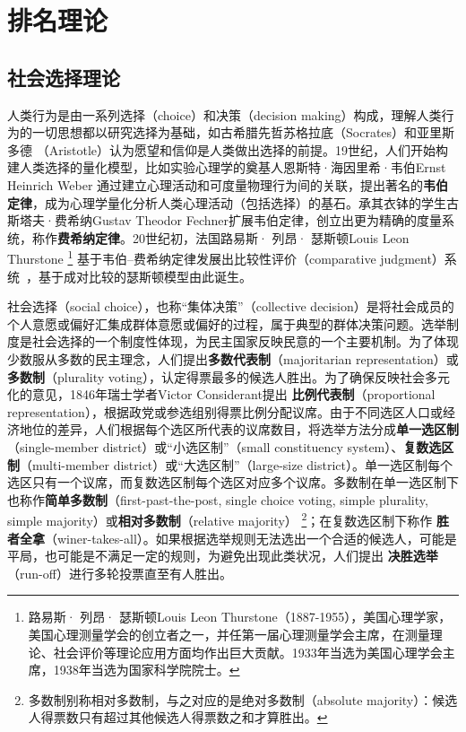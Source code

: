 \part{排名理论}

\chapter{社会选择理论}
人类行为是由一系列选择（choice）和决策（decision making）构成，理解人类行为的一切思想都以研究选择为基础，如古希腊先哲苏格拉底（Socrates）和亚里斯多德
（Aristotle）认为愿望和信仰是人类做出选择的前提。19世纪，人们开始构建人类选择的量化模型，比如实验心理学的奠基人恩斯特·海因里希·韦伯Ernst Heinrich Weber 通过建立心理活动和可度量物理行为间的关联，提出著名的\textbf{韦伯定律}，成为心理学量化分析人类心理活动（包括选择）的基石。承其衣钵的学生古斯塔夫·费希纳Gustav Theodor Fechner扩展韦伯定律，创立出更为精确的度量系统，称作\textbf{费希纳定律}。20世纪初，法国路易斯· 列昂· 瑟斯顿Louis Leon Thurstone
\footnote{路易斯· 列昂· 瑟斯顿Louis Leon Thurstone（1887-1955），美国心理学家，美国心理测量学会的创立者之一，并任第一届心理测量学会主席，在测量理论、社会评价等理论应用方面均作出巨大贡献。1933年当选为美国心理学会主席，1938年当选为国家科学院院士。}
基于韦伯--费希纳定律发展出比较性评价（comparative judgment）系统~\cite{thurstone1927method}，基于成对比较的瑟斯顿模型由此诞生。

社会选择（social choice），也称“集体决策”（collective decision）是将社会成员的个人意愿或偏好汇集成群体意愿或偏好的过程，属于典型的群体决策问题。选举制度是社会选择的一个制度性体现，为民主国家反映民意的一个主要机制。为了体现少数服从多数的民主理念，人们提出\textbf{多数代表制}（majoritarian representation）或\textbf{多数制}（plurality voting），认定得票最多的候选人胜出。为了确保反映社会多元化的意见，1846年瑞士学者Victor Considerant提出
\textbf{比例代表制}（proportional representation），根据政党或参选组别得票比例分配议席。由于不同选区人口或经济地位的差异，人们根据每个选区所代表的议席数目，将选举方法分成\textbf{单一选区制}（single-member district）或“小选区制”（small constituency system）、\textbf{复数选区制}（multi-member district）或“大选区制”（large-size district）。单一选区制每个选区只有一个议席，而复数选区制每个选区对应多个议席。多数制在单一选区制下也称作\textbf{简单多数制}（first-past-the-post, single choice voting, simple plurality, simple majority）或\textbf{相对多数制}（relative majority）
\footnote{多数制别称相对多数制，与之对应的是绝对多数制（absolute majority）：候选人得票数只有超过其他候选人得票数之和才算胜出。}；在复数选区制下称作
\textbf{胜者全拿}（winer-takes-all）。如果根据选举规则无法选出一个合适的候选人，可能是平局，也可能是不满足一定的规则，为避免出现此类状况，人们提出
\textbf{决胜选举}（run-off）进行多轮投票直至有人胜出。

